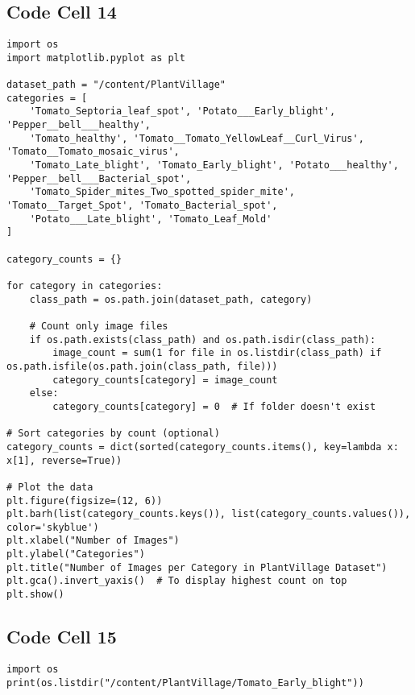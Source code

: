 \documentclass{article}
\begin{document}
\subsection*{Code Cell 14}
\begin{lstlisting}
import os
import matplotlib.pyplot as plt

dataset_path = "/content/PlantVillage"
categories = [
    'Tomato_Septoria_leaf_spot', 'Potato___Early_blight', 'Pepper__bell___healthy',
    'Tomato_healthy', 'Tomato__Tomato_YellowLeaf__Curl_Virus', 'Tomato__Tomato_mosaic_virus',
    'Tomato_Late_blight', 'Tomato_Early_blight', 'Potato___healthy', 'Pepper__bell___Bacterial_spot',
    'Tomato_Spider_mites_Two_spotted_spider_mite', 'Tomato__Target_Spot', 'Tomato_Bacterial_spot',
    'Potato___Late_blight', 'Tomato_Leaf_Mold'
]

category_counts = {}

for category in categories:
    class_path = os.path.join(dataset_path, category)

    # Count only image files
    if os.path.exists(class_path) and os.path.isdir(class_path):
        image_count = sum(1 for file in os.listdir(class_path) if os.path.isfile(os.path.join(class_path, file)))
        category_counts[category] = image_count
    else:
        category_counts[category] = 0  # If folder doesn't exist

# Sort categories by count (optional)
category_counts = dict(sorted(category_counts.items(), key=lambda x: x[1], reverse=True))

# Plot the data
plt.figure(figsize=(12, 6))
plt.barh(list(category_counts.keys()), list(category_counts.values()), color='skyblue')
plt.xlabel("Number of Images")
plt.ylabel("Categories")
plt.title("Number of Images per Category in PlantVillage Dataset")
plt.gca().invert_yaxis()  # To display highest count on top
plt.show()
\end{lstlisting}

\subsection*{Code Cell 15}
\begin{lstlisting}
import os
print(os.listdir("/content/PlantVillage/Tomato_Early_blight"))
\end{lstlisting}
\end{document}
